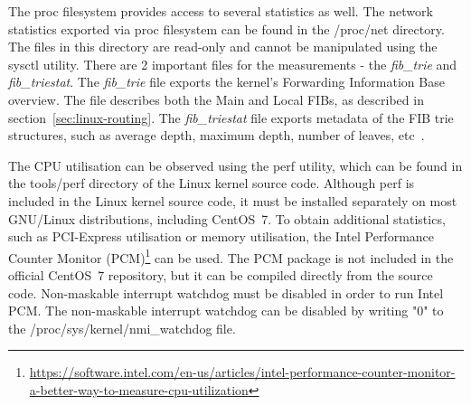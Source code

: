 The proc filesystem provides access to several statistics as well.
The network statistics exported via proc filesystem can be found in the /proc/net directory.
The files in this directory are read-only and cannot be manipulated using the sysctl utility.
There are 2 important files for the measurements - the {\it{fib\_trie}} and {\it{fib\_triestat}}.
The {\it{fib\_trie}} file exports the kernel's Forwarding Information Base overview.
The file describes both the Main and Local FIBs, as described in section~\ref{sec:linux-routing}.
The {\it{fib\_triestat}} file exports metadata of the FIB trie structures,
such as average depth, maximum depth, number of leaves, etc~\cite{kernel-source}.

The CPU utilisation can be observed using the perf utility,
which can be found in the tools/perf directory of the Linux kernel source code.
Although perf is included in the Linux kernel source code,
it must be installed separately on most GNU/Linux distributions, including CentOS~7.
To obtain additional statistics, such as PCI-Express utilisation or memory utilisation,
the Intel Performance Counter Monitor (PCM)\footnote{\url{https://software.intel.com/en-us/articles/intel-performance-counter-monitor-a-better-way-to-measure-cpu-utilization}}
can be used.
The PCM package is not included in the official CentOS~7 repository,
but it can be compiled directly from the source code.
Non-maskable interrupt watchdog must be disabled
in order to run Intel PCM.
The non-maskable interrupt watchdog can be disabled by writing "0" to the /proc/sys/kernel/nmi\_watchdog file.
